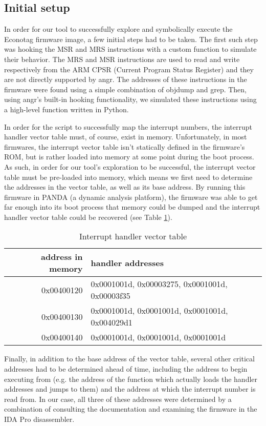 \documentclass[letterpaper, 10 pt, conference]{ieeeconf}
\begin{document}
\subsection{Initial setup} \label{setup}
In order for our tool to successfully explore and symbolically execute the Econotag firmware image, a few initial steps had to be taken. The first such step was hooking the MSR and MRS instructions with a custom function to simulate their behavior. The MRS and MSR instructions are used to read and write respectively from the ARM CPSR (Current Program Status Register) and they are not directly supported by angr. The addresses of these instructions in the firmware were found using a simple combination of objdump and grep. Then, using angr’s built-in hooking functionality, we simulated these instructions using a high-level function written in Python.

In order for the script to successfully map the interrupt numbers, the interrupt handler vector table must, of course, exist in memory. Unfortunately, in most firmwares, the interrupt vector table isn’t statically defined in the firmware’s ROM, but is rather loaded into memory at some point during the boot process. As such, in order for our tool’s exploration to be successful, the interrupt vector table must be pre-loaded into memory, which means we first need to determine the addresses in the vector table, as well as its base address. By running this firmware in PANDA \cite{panda} (a dynamic analysis platform), the firmware was able to get far enough into its boot process that memory could be dumped and the interrupt handler vector table could be recovered (see Table \ref{table:vector}).

\begin{table}[h]
\centering
\begin{tabular}{r|p{4cm}}
address in memory & handler addresses \\ \hline
0x00400120 & 0x0001001d, 0x00003275, 0x0001001d, 0x00003f35 \\
0x00400130& 0x0001001d, 0x0001001d, 0x0001001d, 0x004029d1 \\
0x00400140 & 0x0001001d, 0x0001001d, 0x0001001d\\
\end{tabular}
\caption{Interrupt handler vector table}
\label{table:vector}
\end{table}

Finally, in addition to the base address of the vector table, several other critical addresses had to be determined ahead of time, including the address to begin executing from (e.g. the address of the function which actually loads the handler addresses and jumps to them) and the address at which the interrupt number is read from. In our case, all three of these addresses were determined by a combination of consulting the documentation and examining the firmware in the IDA Pro disassembler.
\end{document}
